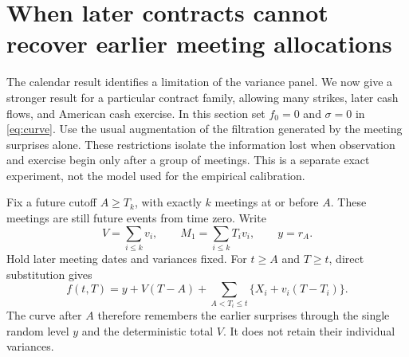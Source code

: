 \section{When later contracts cannot recover earlier meeting allocations}\label{sec:aggregation}
The calendar result identifies a limitation of the variance panel. We now give a stronger result for a particular contract family, allowing many strikes, later cash flows, and American cash exercise. In this section set $f_0=0$ and $\sigma=0$ in \eqref{eq:curve}. Use the usual augmentation of the filtration generated by the meeting surprises alone. These restrictions isolate the information lost when observation and exercise begin only after a group of meetings. This is a separate exact experiment, not the model used for the empirical calibration.

Fix a future cutoff $A\geq T_k$, with exactly $k$ meetings at or before $A$. These meetings are still future events from time zero. Write
\begin{equation}\label{eq:VH}
V=\sum_{i\leq k}v_i,\qquad M_1=\sum_{i\leq k}T_i v_i,\qquad y=r_A.
\end{equation}
Hold later meeting dates and variances fixed. For $t\geq A$ and $T\geq t$, direct substitution gives
\begin{equation}\label{eq:postcurve}
f(t,T)=y+V(T-A)+\sum_{A<T_i\leq t}\{X_i+v_i(T-T_i)\}.
\end{equation}
The curve after $A$ therefore remembers the earlier surprises through the single random level $y$ and the deterministic total $V$. It does not retain their individual variances.

